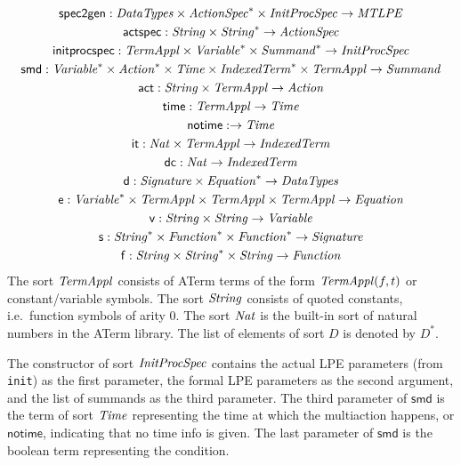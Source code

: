 \documentclass[fleqn,a4paper,dvips]{article}
\newcommand{\aterm}[1]{\mathsf{#1}}
\newcommand{\afunc}[3]{\aterm{#1}:#2\rightarrow#3}
\begin{document}
\begin{gather*}
\afunc{spec2gen}{\nm{DataTypes}\x\nm{ActionSpec}^*\x\nm{InitProcSpec}}{\nm{MTLPE}}\\
\afunc{actspec}{\nm{String}\x\nm{String}^*}{\nm{ActionSpec}}\\
\afunc{initprocspec}{\nm{TermAppl}\x\nm{Variable}^*\x\nm{Summand}^*}{\nm{InitProcSpec}}\\
\afunc{smd}{\nm{Variable}^*\x\nm{Action}^*\x\nm{Time}\x\nm{IndexedTerm}^*\x\nm{TermAppl}}{\nm{Summand}}\\
\afunc{act}{\nm{String}\x\nm{TermAppl}}{\nm{Action}}\\
\afunc{time}{\nm{TermAppl}}{\nm{Time}}\\
\afunc{notime}{}{\nm{Time}}\\
\afunc{it}{\Nat\x\nm{TermAppl}}{\nm{IndexedTerm}}\\
\afunc{dc}{\Nat}{\nm{IndexedTerm}}\\
\afunc{d}{\nm{Signature}\x\nm{Equation}^*}{\nm{DataTypes}}\\
\afunc{e}{\nm{Variable}^*\x\nm{TermAppl}\x\nm{TermAppl}\x\nm{TermAppl}}{\nm{Equation}}\\
\afunc{v}{\nm{String}\x\nm{String}}{\nm{Variable}}\\
\afunc{s}{\nm{String}^*\x\nm{Function}^*\x\nm{Function}^*}{\nm{Signature}}\\
\afunc{f}{\nm{String}\x\nm{String}^{*}\x\nm{String}}{\nm{Function}}
\end{gather*}
The sort $\mathit{TermAppl}$ consists of ATerm terms of the form
$\mathit{TermAppl}(f,t)$ or constant/variable symbols. The sort
$\mathit{String}$ consists of quoted constants, i.e.\ function symbols of
arity 0. The sort $\mathit{Nat}$ is the built-in sort of natural numbers in
the ATerm library. The list of elements of sort $D$ is denoted by
$D^{*}$.

The constructor of sort $\mathit{InitProcSpec}$ contains the actual LPE
parameters (from \texttt{init}) as the first parameter, the formal LPE
parameters as the second argument, and the list of summands as the
third parameter. The third parameter of $\mathsf{smd}$ is the term of
sort $\mathit{Time}$ representing the time at which the multiaction
happens, or $\mathsf{notime}$, indicating that no time info is given.
The last parameter of $\mathsf{smd}$ is the boolean term representing
the condition.
\end{document}
